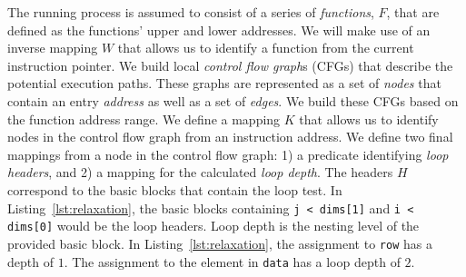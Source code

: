 The running process is assumed to consist of a series of
\textit{functions}, $F$, that are defined as the functions' upper and
lower addresses.  We will make use of an inverse mapping $W$ that
allows us to identify a function from the
current instruction pointer.
We build local \textit{control flow graph}s (CFGs) that describe the potential
execution paths.  These graphs are represented as a set of \textit{nodes} that
contain an entry \textit{address} as well as a set of \textit{edges}.
We build these CFGs based on the
function address range.  We define a mapping $K$ that allows
us to identify nodes in the control flow graph from an instruction
address.
We define two final mappings from a node in the control flow graph: 1)
a predicate identifying \textit{loop headers}, and 2) a mapping for the
calculated \textit{loop depth}.  The headers $H$ correspond to the
basic blocks that contain the loop test.  In Listing~\ref{lst:relaxation},
the basic blocks containing \texttt{j < dims[1]} and \texttt{i <
dims[0]} would be the loop headers.  Loop depth is the nesting level of
the provided basic block.  In Listing~\ref{lst:relaxation}, the
assignment to \texttt{row} has a depth of $1$.  The assignment to the
element in \texttt{data} has a loop depth of $2$.

